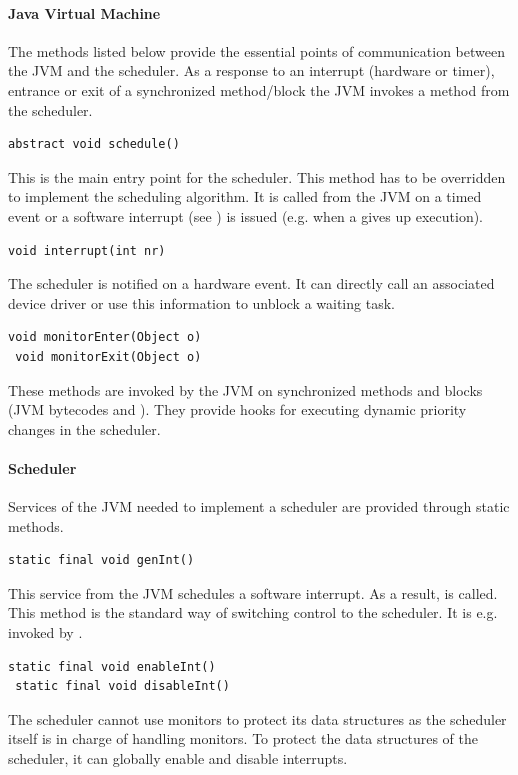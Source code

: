 \paragraph{Java Virtual Machine}

The methods listed below provide the essential points of
communication between the JVM and the scheduler. As a response to an
interrupt (hardware or timer), entrance or exit of a synchronized
method/block the JVM invokes a method from the scheduler.

\begin{lstlisting}[emph=schedule]
abstract void schedule()
\end{lstlisting}
This is the main entry point for the scheduler. This method has to
be overridden to implement the scheduling algorithm. It is called
from the JVM on a timed event or a software interrupt (see
) is issued (e.g. when a  gives up
execution).

\begin{lstlisting}[emph=interrupt]
void interrupt(int nr)
\end{lstlisting}
The scheduler is notified on a hardware event. It can directly call
an associated device driver or use this information to unblock a
waiting task.

\begin{lstlisting}[emph={monitorEnter,monitorExit}]
 void monitorEnter(Object o)
 void monitorExit(Object o)
\end{lstlisting}
These methods are invoked by the JVM on synchronized methods and
blocks (JVM bytecodes  and ).
They provide hooks for executing dynamic priority changes in the
scheduler.

\paragraph{Scheduler}

Services of the JVM needed to implement a scheduler are provided
through static methods.

\begin{lstlisting}[emph=genInt]
static final void genInt()
\end{lstlisting}
This service from the JVM schedules a software interrupt. As a
result,  is called. This method is the standard way
of switching control to the scheduler. It is e.g. invoked by
.

\begin{lstlisting}[emph={enableInt,disableInt}]
 static final void enableInt()
 static final void disableInt()
\end{lstlisting}
The scheduler cannot use monitors to protect its data structures as
the scheduler itself is in charge of handling monitors. To protect
the data structures of the scheduler, it can globally enable and
disable interrupts.

